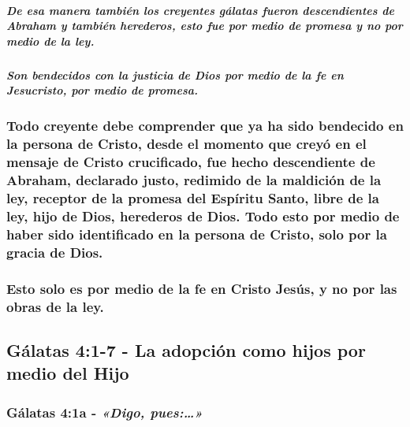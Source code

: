 \documentclass[11a pt,twoside]{article}
\newcommand{\scripture}[1]{%
  {\fontsize{12pt}{16pt}\selectfont\ScriptureFont\itshape #1}%
}
\let\oldsubsection\subsection
\renewcommand{\subsection}{\needspace{5\baselineskip}\oldsubsection}
\let\oldsubsubsection\subsubsection
\renewcommand{\subsubsection}{\needspace{4\baselineskip}\oldsubsubsection}
\let\oldsubparagraph\subparagraph
\renewcommand{\subparagraph}{\needspace{2\baselineskip}\oldsubparagraph}
\begin{document}
\subparagraph{De esa manera también los creyentes gálatas fueron
descendientes de Abraham y también herederos, esto fue por medio de
promesa y no por medio de la
ley.}\label{de-esa-manera-tambiuxe9n-los-creyentes-guxe1latas-fueron-descendientes-de-abraham-y-tambiuxe9n-herederos-esto-fue-por-medio-de-promesa-y-no-por-medio-de-la-ley.}

\subparagraph{Son bendecidos con la justicia de Dios por medio de la fe
en Jesucristo, por medio de
promesa.}\label{son-bendecidos-con-la-justicia-de-dios-por-medio-de-la-fe-en-jesucristo-por-medio-de-promesa.}

\subsubsection{Todo creyente debe comprender que ya ha sido bendecido en
la persona de Cristo, desde el momento que creyó en el mensaje de Cristo
crucificado, fue hecho descendiente de Abraham, declarado justo,
redimido de la maldición de la ley, receptor de la promesa del Espíritu
Santo, libre de la ley, hijo de Dios, herederos de Dios. Todo esto por
medio de haber sido identificado en la persona de Cristo, solo por la
gracia de
Dios.}\label{todo-creyente-debe-comprender-que-ya-ha-sido-bendecido-en-la-persona-de-cristo-desde-el-momento-que-creyuxf3-en-el-mensaje-de-cristo-crucificado-fue-hecho-descendiente-de-abraham-declarado-justo-redimido-de-la-maldiciuxf3n-de-la-ley-receptor-de-la-promesa-del-espuxedritu-santo-libre-de-la-ley-hijo-de-dios-herederos-de-dios.-todo-esto-por-medio-de-haber-sido-identificado-en-la-persona-de-cristo-solo-por-la-gracia-de-dios.}

\subsubsection{Esto solo es por medio de la fe en Cristo Jesús, y no por
las obras de la
ley.}\label{esto-solo-es-por-medio-de-la-fe-en-cristo-jesuxfas-y-no-por-las-obras-de-la-ley.}

\subsection{Gálatas 4:1-7 - La adopción como hijos por medio del
Hijo}\label{guxe1latas-41-7---la-adopciuxf3n-como-hijos-por-medio-del-hijo}

\subsubsection{\texorpdfstring{Gálatas 4:1a -
\scripture{«Digo, pues:…»}}{Gálatas 4:1a - }}\label{guxe1latas-41a---digo-pues}
\end{document}
